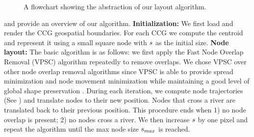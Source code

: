 {\begin{figure}[tb!]
    \caption{A flowchart showing the abstraction of our layout algorithm.}
    \label{fig:flowchart}
\end{figure}
}

 and  provide an overview of our algorithm. \textbf{Initialization:} We first load and render the CCG geospatial boundaries. For each CCG we compute the centroid and represent it using a small square node with $ s $ as the initial size. \textbf{Node layout:} The basic algorithm is as follows: we first apply the Fast Node Overlap Removal (VPSC) algorithm \cite{dwyer2006fast} repeatedly to remove overlaps. We chose VPSC over other node overlap removal algorithms since VPSC is able to provide spread minimization and node movement minimization while maintaining a good level of global shape preservation \cite{chen2020Node}. During each iteration, we compute node trajectories (See ) and translate nodes to their new position. Nodes that cross a river are translated back to their previous position. This procedure ends when 1) no node overlap is present; 2) no nodes cross a river. We then increase $ s $ by one pixel and repeat the algorithm until the max node size $ s_{max} $ is reached. 


